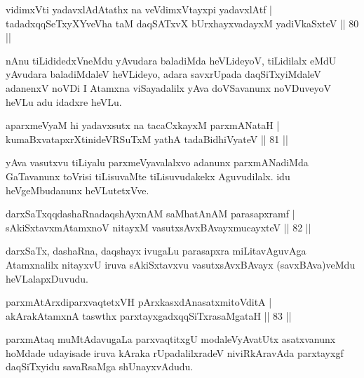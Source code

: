 \begin{shl}
vidimxVti yadavxlAdAtathx na veVdimxVtayxpi yadavxlAtf |\\
tadadxqqSeTxyXYveVha taM daqSATxvX bUrxhayxvadayxM yadiVkaSxteV \hfill || 80 ||
\end{shl}

\begin{artha}
nAnu tiLididedxVneMdu yAvudara baladiMda heVLideyoV, tiLidilalx eMdU yAvudara baladiMdaleV heVLideyo, adara savxrUpada daqSiTxyiMdaleV adanenxV noVDi I Atamxna viSayadalilx yAva doVSavanunx noVDuveyoV heVLu adu idadxre heVLu.
\end{artha}%


\begin{shl}
aparxmeVyaM hi yadavxsutx na tacaCxkayxM parxmANataH |\\
kumaBxvatapxrXtinideVRSuTxM yathA tadaBidhiVyateV \hfill || 81 ||
\end{shl}

\begin{artha}
yAva vasutxvu tiLiyalu parxmeVyavalalxvo adanunx parxmANadiMda GaTavanunx toVrisi tiLisuvaMte tiLisuvudakekx Aguvudilalx. idu heVgeMbudanunx heVLutetxVve.
\end{artha}


\begin{shl}
darxSaTxqqdashaRnadaqshAyxnAM saMhatAnAM parasapxramf |\\
sAkiSxtavxmAtamxnoV nitayxM vasutxsAvxBAvayxmucayxteV \hfill || 82 ||
\end{shl}

\begin{artha}
darxSaTx, dashaRna, daqshayx ivugaLu parasapxra miLitavAguvAga Atamxnalilx nitayxvU iruva sAkiSxtavxvu vasutxsAvxBAvayx (savxBAva)veMdu heVLalapxDuvudu.
\end{artha}

\begin{shl}
parxmAtArxdiparxvaqtetxVH pArxkasxdAnasatxmitoVditA |\\
akArakAtamxnA taswthx parxtayxgadxqqSiTxrasaMgataH \hfill || 83 ||
\end{shl}

\begin{artha}
parxmAtaq muMtAdavugaLa parxvaqtitxgU modaleVyAvatUtx asatxvanunx hoMdade udayisade iruva kAraka rUpadalilxradeV niviRkAravAda parxtayxgf daqSiTxyidu savaRsaMga shUnayxvAdudu.
\end{artha}

